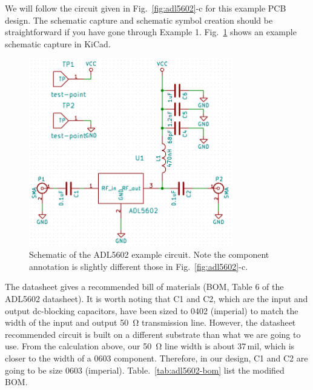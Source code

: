 \documentclass[12pt,letterpaper]{scrartcl}
\begin{document}
We will follow the circuit given in Fig.~\ref{fig:adl5602}-c for this example PCB design. The schematic capture and schematic symbol creation should be straightforward if you have gone through Example 1. Fig.~\ref{fig:example2-schematic} shows an example schematic capture in KiCad. 

\begin{figure}[ph]
	\centering
	\includegraphics[width=3.5in]{example2-schematic}
	\caption{Schematic of the ADL5602 example circuit. Note the component annotation is slightly different those in Fig.~\ref{fig:adl5602}-c.}
	\label{fig:example2-schematic}
\end{figure}

The datasheet gives a recommended bill of materials (BOM, Table 6 of the ADL5602 datasheet). It is worth noting that C1 and C2, which are the input and output dc-blocking capacitors, have been sized to 0402 (imperial) to match the width of the input and output \SI{50}{\ohm} transmission line. However, the datasheet recommended circuit is built on a different substrate than what we are going to use. From the calculation above, our \SI{50}{\ohm} line width is about 37\,mil, which is closer to the width of a 0603 component. Therefore, in our design, C1 and C2 are going to be size 0603 (imperial). Table.~\ref{tab:adl5602-bom} list the modified BOM. 
\end{document}
